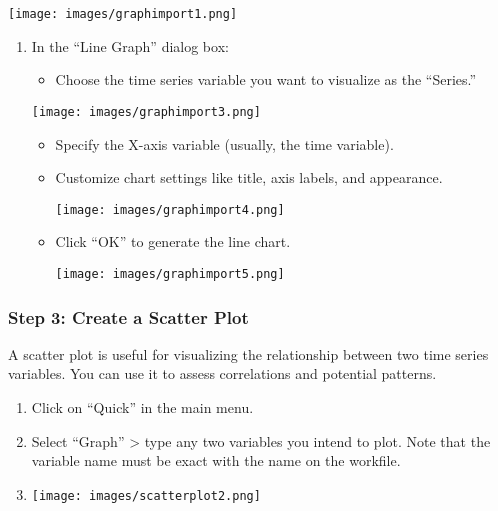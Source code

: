 \documentclass[
  letterpaper,
  DIV=11,
  numbers=noendperiod]{scrartcl}
\providecommand{\tightlist}{%
  \setlength{\itemsep}{0pt}\setlength{\parskip}{0pt}}\usepackage{longtable,booktabs,array}
\begin{document}
\texttt{[image: images/graphimport1.png]}

\begin{enumerate}
\def\labelenumi{\arabic{enumi}.}
\item
  In the ``Line Graph'' dialog box:

  \begin{itemize}
  \tightlist
  \item
    Choose the time series variable you want to visualize as the
    ``Series.''
  \end{itemize}

  \texttt{[image: images/graphimport3.png]}

  \begin{itemize}
  \item
    Specify the X-axis variable (usually, the time variable).
  \item
    Customize chart settings like title, axis labels, and appearance.

    \texttt{[image: images/graphimport4.png]}
  \item
    Click ``OK'' to generate the line chart.

    \texttt{[image: images/graphimport5.png]}
  \end{itemize}
\end{enumerate}

\hypertarget{step-3-create-a-scatter-plot}{%
\subsubsection{\texorpdfstring{\textbf{Step 3: Create a Scatter
Plot}}{Step 3: Create a Scatter Plot}}\label{step-3-create-a-scatter-plot}}

A scatter plot is useful for visualizing the relationship between two
time series variables. You can use it to assess correlations and
potential patterns.

\begin{enumerate}
\def\labelenumi{\arabic{enumi}.}
\item
  Click on ``Quick'' in the main menu.
\item
  Select ``Graph'' \textgreater{} type any two variables you intend to
  plot. Note that the variable name must be exact with the name on the
  workfile.
\item
  \texttt{[image: images/scatterplot2.png]}
\end{enumerate}
\end{document}
